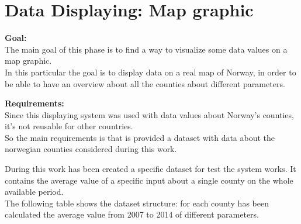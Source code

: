 \newpage

\section{Data Displaying: Map graphic}
\textbf{Goal:}\\
The main goal of this phase is to find a way to visualize some data values on a map graphic.\\
In this particular the goal is to display data on a real map of Norway, in order to be able to have an overview about all the counties about different parameters.

\textbf{Requirements:}\\
Since this displaying system was used with data values about Norway's counties, it's not reusable for other countries.\\
So the main requirements is that is provided a dataset with data about the norwegian counties considered during this work.

During this work has been created a specific dataset for test the system works. It contains the average value of a specific input about a single county on the whole available period.\\
The following table shows the dataset structure: for each county has been calculated the average value from 2007 to 2014 of different parameters.\\

    
